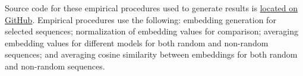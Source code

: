 Source code for these empirical procedures used to generate results is \href{https://github.com/rgavigan/e-score/blob/main/src/e-score.ipynb}{located on GitHub}. Empirical procedures use the following: embedding generation for selected sequences; normalization of embedding values for comparison; averaging embedding values for different models for both random and non-random sequences; and averaging cosine similarity between embeddings for both random and non-random sequences.
